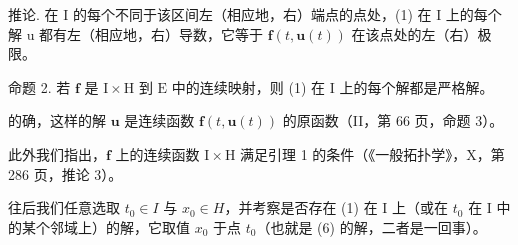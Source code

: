推论. 在 I 的每个不同于该区间左（相应地，右）端点的点处，(1) 在 I 上的每个解 u 都有左（相应地，右）导数，它等于 \(\mathbf{f}(t,\mathbf{u}(t))\) 在该点处的左（右）极限。

命题 2. 若 \(\mathbf{f}\) 是 \(\mathrm{I} \times \mathrm{H}\) 到 \(\mathrm{E}\) 中的连续映射，则 (1) 在 \(\mathrm{I}\) 上的每个解都是严格解。

的确，这样的解 \(\mathbf{u}\) 是连续函数 \(\mathbf{f}(t,\mathbf{u}(t))\) 的原函数（II，第 66 页，命题 3）。

此外我们指出，\(\mathbf{f}\) 上的连续函数 \(\mathrm{I} \times \mathrm{H}\) 满足引理 1 的条件（《一般拓扑学》，X，第 286 页，推论 3）。

往后我们任意选取 \(t_{0} \in I\) 与 \(x_{0} \in H\)，并考察是否存在 (1) 在 I 上（或在 \(t_{0}\) 在 I 中的某个邻域上）的解，它取值 \(x_{0}\) 于点 \(t_{0}\)（也就是 (6) 的解，二者是一回事）。

